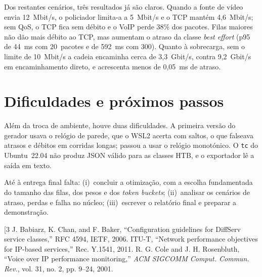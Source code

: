\documentclass[a4paper]{llncs}
\begin{document}
Dos restantes cenários, três resultados já são claros. Quando a fonte de vídeo envia
12~Mbit/s, o policiador limita-a a 5~Mbit/s e o TCP mantém 4,6~Mbit/s; sem QoS, o TCP
fica sem débito e o VoIP perde 38\% dos pacotes. Filas maiores não dão mais débito
ao TCP, mas aumentam o atraso da classe \emph{best effort} (p95 de 44~ms com 20~pacotes
e de 592~ms com 300). Quanto à sobrecarga, sem o limite de 10~Mbit/s a cadeia encaminha
cerca de 3,3~Gbit/s, contra 9,2~Gbit/s em encaminhamento direto, e acrescenta menos de
0,05~ms de atraso.

\section{Dificuldades e próximos passos}

Além da troca de ambiente, houve duas dificuldades. A primeira versão do gerador usava
o relógio de parede, que o WSL2 acerta com saltos, o que falseava atrasos e débitos em
corridas longas; passou a usar o relógio monotónico. O \texttt{tc} do Ubuntu~22.04 não
produz JSON válido para as classes HTB, e o exportador lê a saída em texto.

Até à entrega final falta: (i)~concluir a otimização, com a escolha fundamentada
do tamanho das filas, dos pesos e dos \emph{token buckets}; (ii)~analisar os cenários
de atraso, perdas e falha no núcleo; (iii)~escrever o relatório final e preparar a
demonstração.

\begin{thebibliography}{[3}
\makeatletter\renewcommand\@biblabel[1]{[#1]}\makeatother  %
 J. Babiarz, K. Chan, and F. Baker, ``Configuration guidelines for DiffServ service classes,'' RFC 4594, IETF, 2006.
 ITU-T, ``Network performance objectives for IP-based services,'' Rec. Y.1541, 2011.
 R. G. Cole and J. H. Rosenbluth, ``Voice over IP performance monitoring,'' \emph{ACM SIGCOMM Comput. Commun. Rev.}, vol. 31, no. 2, pp. 9--24, 2001.
\end{thebibliography}
\end{document}
